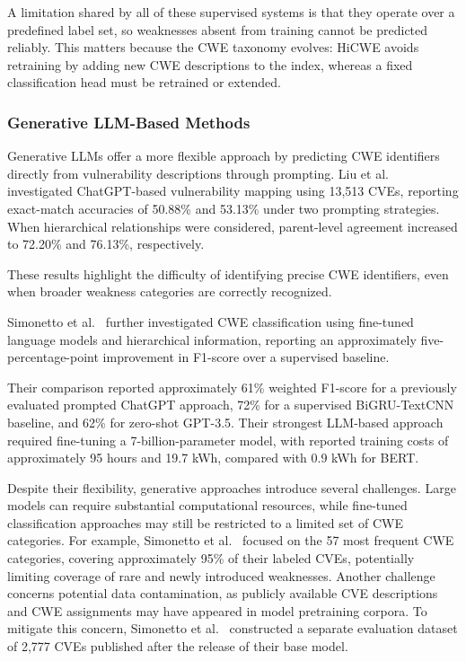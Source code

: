 \documentclass[conference,compsoc]{IEEEtran}
\begin{document}
A limitation shared by all of these supervised systems is that they operate over a predefined label set, so weaknesses absent from training cannot be predicted reliably. This matters because the CWE taxonomy evolves: HiCWE avoids retraining by adding new CWE descriptions to the index, whereas a fixed classification head must be retrained or extended.


\subsubsection{Generative LLM-Based Methods}

Generative LLMs offer a more flexible approach
by predicting CWE identifiers directly from
vulnerability descriptions through prompting.
Liu et al.~\cite{liu2023not} investigated
ChatGPT-based vulnerability mapping using
13,513 CVEs, reporting exact-match accuracies
of 50.88\% and 53.13\% under two prompting
strategies. When hierarchical relationships
were considered, parent-level agreement
increased to 72.20\% and 76.13\%,
respectively.

These results highlight the difficulty of
identifying precise CWE identifiers, even
when broader weakness categories are
correctly recognized.

Simonetto et al.~\cite{simonetto2026knowing}
further investigated CWE classification using
fine-tuned language models and hierarchical
information, reporting an approximately
five-percentage-point improvement in F1-score
over a supervised baseline.

Their comparison reported approximately
61\% weighted F1-score for a previously
evaluated prompted ChatGPT approach,
72\% for a supervised BiGRU-TextCNN baseline,
and 62\% for zero-shot GPT-3.5.
Their strongest LLM-based approach required
fine-tuning a 7-billion-parameter model,
with reported training costs of approximately
95 hours and 19.7 kWh, compared with
0.9 kWh for BERT.

Despite their flexibility, generative
approaches introduce several challenges.
Large models can require substantial
computational resources, while fine-tuned
classification approaches may still be
restricted to a limited set of CWE categories.
For example, Simonetto et
al.~\cite{simonetto2026knowing} focused on
the 57 most frequent CWE categories,
covering approximately 95\% of their
labeled CVEs, potentially limiting coverage
of rare and newly introduced weaknesses. Another challenge concerns potential data
contamination, as publicly available CVE
descriptions and CWE assignments may have
appeared in model pretraining corpora.
To mitigate this concern, Simonetto et al.~\cite{simonetto2026knowing}
constructed a separate evaluation dataset
of 2,777 CVEs published after the release
of their base model.
\end{document}
